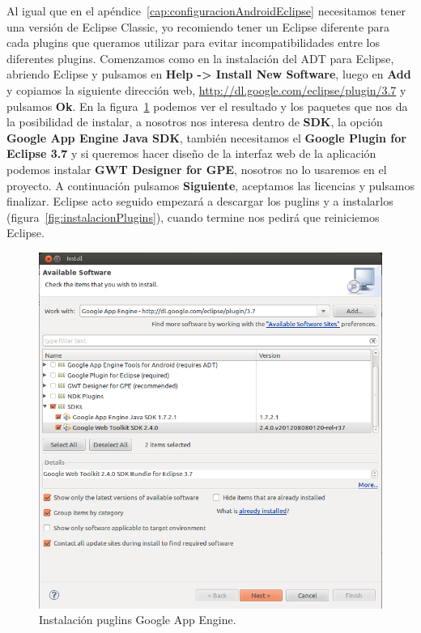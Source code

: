 Al igual que en el apéndice~\ref{cap:configuracionAndroidEclipse} necesitamos tener una versión de Eclipse Classic, yo recomiendo tener un Eclipse diferente para cada plugins que queramos utilizar para evitar incompatibilidades entre los diferentes plugins. Comenzamos como en la instalación del ADT para Eclipse, abriendo Eclipse y pulsamos en \textbf{Help -> Install New Software}, luego en \textbf{Add} y copiamos la siguiente dirección web, \url{http://dl.google.com/eclipse/plugin/3.7} y pulsamos \textbf{Ok}. En la figura~\ref{fig:instalacionGAE} podemos ver el resultado y los paquetes que nos da la posibilidad de instalar, a nosotros nos interesa dentro de \textbf{SDK}, la opción \textbf{Google App Engine Java SDK}, también necesitamos el \textbf{Google Plugin for Eclipse 3.7} y si queremos hacer diseño de la interfaz web de la aplicación podemos instalar \textbf{GWT Designer for GPE}, nosotros no lo usaremos en el proyecto. A continuación pulsamos \textbf{Siguiente}, aceptamos las licencias y pulsamos finalizar. Eclipse acto seguido empezará a descargar los puglins y a instalarlos (figura~\ref{fig:instalacionPlugins}), cuando termine nos pedirá que reiniciemos Eclipse.

\begin{figure}
  \centering
    \includegraphics[scale=0.6]{./ConfiguracionEclipse/imagenes/instalacionGAE.png}
  \caption{Instalación puglins Google App Engine.}
  \label{fig:instalacionGAE}
\end{figure}

